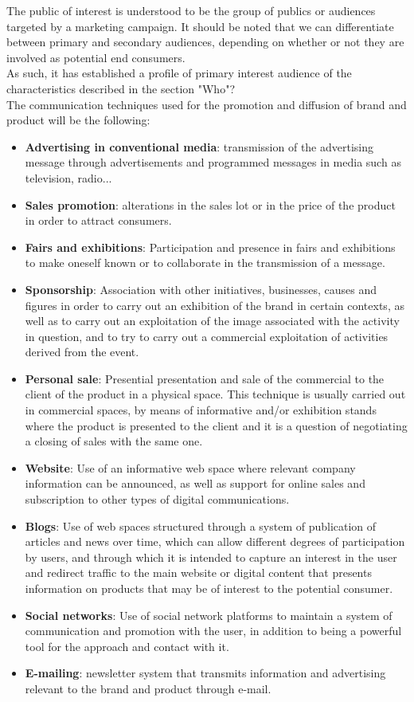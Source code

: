 \documentclass[11pt,a4paper]{article}
\begin{document}
The public of interest is understood to be the group of publics or audiences targeted by a marketing campaign. It should be noted that we can differentiate between primary and secondary audiences, depending on whether or not they are involved as potential end consumers.\\

As such, it has established a profile of primary interest audience of the characteristics described in the section "Who"?\\ 

The communication techniques used for the promotion and diffusion of brand and product will be the following:\\
\begin{itemize}
\item \textbf{Advertising in conventional media}: transmission of the advertising message through advertisements and programmed messages in media such as television, radio...
\item \textbf{Sales promotion}: alterations in the sales lot or in the price of the product in order to attract consumers.
\item \textbf{Fairs and exhibitions}: Participation and presence in fairs and exhibitions to make oneself known or to collaborate in the transmission of a message. 
\item \textbf{Sponsorship}: Association with other initiatives, businesses, causes and figures in order to carry out an exhibition of the brand in certain contexts, as well as to carry out an exploitation of the image associated with the activity in question, and to try to carry out a commercial exploitation of activities derived from the event.
\item \textbf{Personal sale}: Presential presentation and sale of the commercial to the client of the product in a physical space. This technique is usually carried out in commercial spaces, by means of informative and/or exhibition stands where the product is presented to the client and it is a question of negotiating a closing of sales with the same one. 
\item \textbf{Website}: Use of an informative web space where relevant company information can be announced, as well as support for online sales and subscription to other types of digital communications.
\item \textbf{Blogs}: Use of web spaces structured through a system of publication of articles and news over time, which can allow different degrees of participation by users, and through which it is intended to capture an interest in the user and redirect traffic to the main website or digital content that presents information on products that may be of interest to the potential consumer.
\item \textbf{Social networks}: Use of social network platforms to maintain a system of communication and promotion with the user, in addition to being a powerful tool for the approach and contact with it.
\item \textbf{E-mailing}: newsletter system that transmits information and advertising relevant to the brand and product through e-mail. 
\end{itemize}
\end{document}
